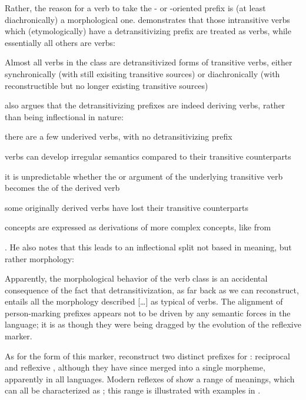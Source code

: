 Rather, the reason for a verb to take the - or -oriented prefix is (at least diachronically) a morphological one.
\textcite[217--221]{meira2000split} demonstrates that those intransitive verbs which (etymologically) have a detransitivizing prefix are treated as  verbs, while essentially all others are  verbs:
\begin{quotebox}{\parencite[201]{meira2000split}}
Almost all verbs in the  class are detransitivized forms of transitive verbs, either synchronically (with still exisiting transitive sources) or diachronically (with reconstructible but no longer existing transitive sources)
\end{quotebox}
\textcite[221--223]{meira2000split} also argues that the detransitivizing prefixes are indeed deriving  verbs, rather than being inflectional in nature:
\begin{inlinelist}
	\item there are a few underived  verbs, with no detransitivizing prefix
	\item {} verbs can develop irregular semantics compared to their transitive counterparts
	\item it is unpredictable whether the  or  argument of the underlying transitive verb becomes the  of the derived  verb
	\item some originally derived  verbs have lost their transitive counterparts
	\item {} concepts are expressed as derivations of more complex concepts, like  from 
\end{inlinelist}.
He also notes that this leads to an inflectional split not based in meaning, but rather morphology:

\begin{quotebox}{\parencite[226]{meira2000split}}
Apparently, the morphological behavior of the  verb class is an accidental consequence of the fact that detransitivization, as far back as we can reconstruct, entails all the morphology described […] as typical of  verbs. The alignment of person-marking prefixes appears not to be driven by any semantic forces in the language; it is as though they were being dragged by the evolution of the reflexive marker.
\end{quotebox}

As for the form of this marker, \textcite[505--512]{meira2010origin} reconstruct two distinct  prefixes for \PC: reciprocal  and reflexive , although they have since merged into a single morpheme, apparently in all languages.
Modern reflexes of \detrz show a range of meanings, which can all be characterized as ; this range is illustrated with \trio examples in .

